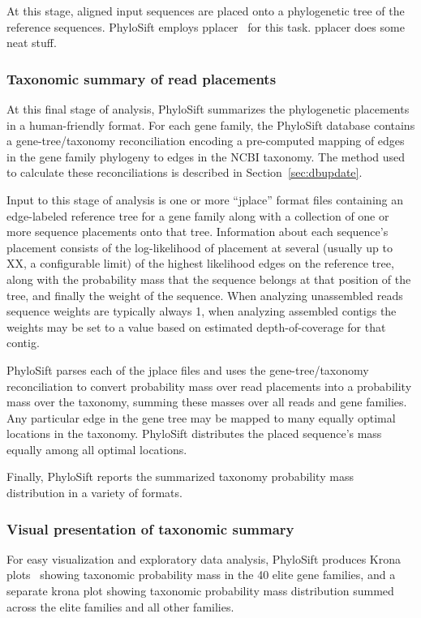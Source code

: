 \documentclass[10pt]{article}
\begin{document}
At this stage, aligned input sequences are placed onto a phylogenetic tree of the reference sequences.
PhyloSift employs pplacer~\cite{Matsen2010} for this task.
pplacer does some neat stuff.


\subsubsection*{Taxonomic summary of read placements}
At this final stage of analysis, PhyloSift summarizes the phylogenetic placements in a human-friendly format.
For each gene family, the PhyloSift database contains a gene-tree/taxonomy reconciliation encoding a pre-computed mapping of edges in the gene family phylogeny to edges in the NCBI taxonomy.
The method used to calculate these reconciliations is described in Section~\ref{sec:dbupdate}.

Input to this stage of analysis is one or more ``jplace'' format files containing an edge-labeled reference tree for a gene family along with a collection of one or more sequence placements onto that tree.
Information about each sequence's placement consists of the log-likelihood of placement at several (usually up to XX, a configurable limit) of the highest likelihood edges on the reference tree, along with the probability mass that the sequence belongs at that position of the tree, and finally the weight of the sequence. 
When analyzing unassembled reads sequence weights are typically always 1, when analyzing assembled contigs the weights may be set to a value based on estimated depth-of-coverage for that contig.

PhyloSift parses each of the jplace files and uses the gene-tree/taxonomy reconciliation to convert probability mass over read placements into a probability mass over the taxonomy, summing these masses over all reads and gene families.
Any particular edge in the gene tree may be mapped to many equally optimal locations in the taxonomy.
PhyloSift distributes the placed sequence's mass equally among all optimal locations.

Finally, PhyloSift reports the summarized taxonomy probability mass distribution in a variety of formats.

\subsubsection*{Visual presentation of taxonomic summary}

For easy visualization and exploratory data analysis, PhyloSift produces Krona plots~\cite{Ondov2011} showing taxonomic probability mass in the 40 elite gene families, and a separate krona plot showing taxonomic probability mass distribution summed across the elite families and all other families.
\end{document}
